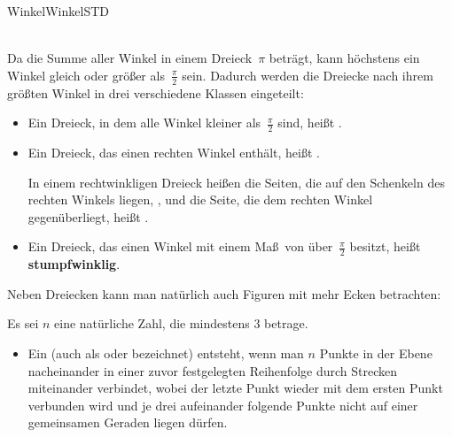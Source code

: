 \begin{MXContent}{Winkel}{Winkel}{STD}


\ \\
Da die Summe aller Winkel in einem Dreieck~$\pi$ betr\"agt, kann h\"ochstens
ein Winkel gleich oder gr\"o\ss er als~$\frac{\pi}{2}$ sein. Dadurch werden die
Dreiecke nach ihrem gr\"o\ss ten Winkel in drei verschiedene Klassen eingeteilt:
\begin{MInfo}%
\begin{itemize}
 \item Ein Dreieck, in dem alle Winkel kleiner als~$\frac{\pi}{2}$ sind, hei\ss t .
 
 \item Ein Dreieck, das einen rechten Winkel enth\"alt, hei\ss t .
 
       In einem rechtwinkligen Dreieck hei\ss en die Seiten, die auf den Schenkeln des
       rechten Winkels liegen, ,
       und die Seite, die dem rechten Winkel gegen\"uberliegt, hei\ss t
       .
       
 \item Ein Dreieck, das einen Winkel mit einem Ma\ss\ von \"uber~$\frac{\pi}{2}$
       besitzt, hei\ss t \textbf{stumpfwinklig}.
\end{itemize}
\end{MInfo}

Neben Dreiecken kann man nat\"urlich auch Figuren mit mehr Ecken betrachten:

\begin{MInfo}%
Es sei $n$ eine nat\"urliche Zahl, die mindestens $3$ betrage.
\begin{itemize}
 \item 
Ein  (auch als  oder  bezeichnet) entsteht,
      wenn man $n$ Punkte in der Ebene nacheinander in einer zuvor festgelegten Reihenfolge durch Strecken miteinander verbindet,
			wobei der letzte Punkt wieder mit dem ersten Punkt verbunden wird und je drei aufeinander folgende Punkte nicht auf einer gemeinsamen Geraden
			liegen d\"urfen.
       

\end{itemize}
\end{MInfo}
\end{MXContent}
